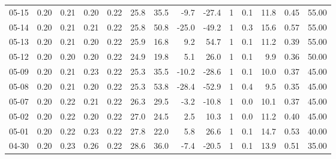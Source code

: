 \begin{threeparttable}
{\begin{tabular}{lrrrrrrrrrrrrr}
  05-15 &          0.20 &          0.21 &          0.20 &        0.22 &                25.8 &                35.5 &       -9.7 &        -27.4 &              1 &                 0.1 &             11.8 &            0.45 &                  55.00 \\
  05-14 &          0.20 &          0.21 &          0.21 &        0.22 &                25.8 &                50.8 &      -25.0 &        -49.2 &              1 &                 0.3 &             15.6 &            0.57 &                  55.00 \\
  05-13 &          0.20 &          0.21 &          0.20 &        0.22 &                25.9 &                16.8 &        9.2 &         54.7 &              1 &                 0.1 &             11.2 &            0.39 &                  55.00 \\
  05-12 &          0.20 &          0.20 &          0.20 &        0.22 &                24.9 &                19.8 &        5.1 &         26.0 &              1 &                 0.1 &              9.9 &            0.36 &                  50.00 \\
  05-09 &          0.20 &          0.21 &          0.23 &        0.22 &                25.3 &                35.5 &      -10.2 &        -28.6 &              1 &                 0.1 &             10.0 &            0.37 &                  45.00 \\
  05-08 &          0.20 &          0.21 &          0.20 &        0.22 &                25.3 &                53.8 &      -28.4 &        -52.9 &              1 &                 0.4 &              9.5 &            0.35 &                  45.00 \\
  05-07 &          0.20 &          0.22 &          0.21 &        0.22 &                26.3 &                29.5 &       -3.2 &        -10.8 &              1 &                 0.0 &             10.1 &            0.37 &                  45.00 \\
  05-02 &          0.20 &          0.22 &          0.20 &        0.22 &                27.0 &                24.5 &        2.5 &         10.3 &              1 &                 0.0 &             11.2 &            0.40 &                  45.00 \\
  05-01 &          0.20 &          0.22 &          0.23 &        0.22 &                27.8 &                22.0 &        5.8 &         26.6 &              1 &                 0.1 &             14.7 &            0.53 &                  40.00 \\
  04-30 &          0.20 &          0.23 &          0.26 &        0.22 &                28.6 &                36.0 &       -7.4 &        -20.5 &              1 &                 0.1 &             13.9 &            0.51 &                  35.00 \\

\end{tabular}}
\end{threeparttable}

